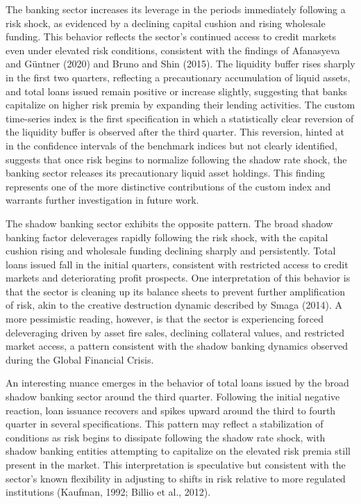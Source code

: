 \documentclass[12pt,a4paper]{report}
\begin{document}
The banking sector increases its leverage in the periods immediately following
a risk shock, as evidenced by a declining capital cushion and rising wholesale
funding. This behavior reflects the sector's continued access to credit markets
even under elevated risk conditions, consistent with the findings of Afanasyeva and Güntner (2020) and Bruno and Shin (2015). The liquidity buffer rises sharply in the
first two quarters, reflecting a precautionary accumulation of liquid assets,
and total loans issued remain positive or increase slightly, suggesting that
banks capitalize on higher risk premia by expanding their lending activities.
The custom time-series index is the first specification in which a statistically
clear reversion of the liquidity buffer is observed after the third quarter.
This reversion, hinted at in the confidence intervals of the benchmark indices
but not clearly identified, suggests that once risk begins to normalize following
the shadow rate shock, the banking sector releases its precautionary liquid
asset holdings. This finding represents one of the more distinctive contributions
of the custom index and warrants further investigation in future work.

The shadow banking sector exhibits the opposite pattern. The broad shadow
banking factor deleverages rapidly following the risk shock, with the capital
cushion rising and wholesale funding declining sharply and persistently. Total
loans issued fall in the initial quarters, consistent with restricted access to
credit markets and deteriorating profit prospects. One interpretation of this
behavior is that the sector is cleaning up its balance sheets to prevent further
amplification of risk, akin to the creative destruction dynamic described by
Smaga (2014). A more pessimistic reading, however, is that the sector is
experiencing forced deleveraging driven by asset fire sales, declining collateral
values, and restricted market access, a pattern consistent with the shadow
banking dynamics observed during the Global Financial Crisis.

An interesting nuance emerges in the behavior of total loans issued by the
broad shadow banking sector around the third quarter. Following the initial
negative reaction, loan issuance recovers and spikes upward around the third
to fourth quarter in several specifications. This pattern may reflect a
stabilization of conditions as risk begins to dissipate following the shadow rate
shock, with shadow banking entities attempting to capitalize on the elevated
risk premia still present in the market. This interpretation is speculative but
consistent with the sector's known flexibility in adjusting to shifts in risk
relative to more regulated institutions (Kaufman, 1992; Billio et al., 2012).
\end{document}
